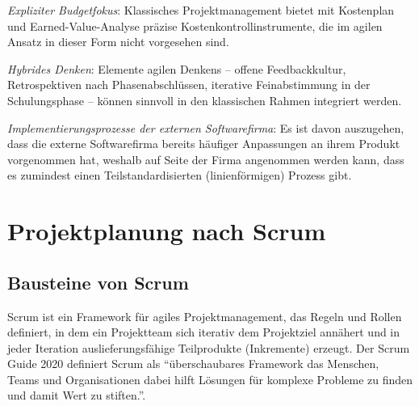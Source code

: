 \documentclass[
    a4paper,
    11pt,
    bibliography=totoc,
    listof=totoc,
    parskip=half,
    headings=normal
]{scrbook}
\begin{document}
\textit{Expliziter Budgetfokus}: Klassisches Projektmanagement bietet mit
Kostenplan und Earned-Value-Analyse präzise Kostenkontrollinstrumente, die im
agilen Ansatz in dieser Form nicht vorgesehen sind.

\textit{Hybrides Denken}: Elemente agilen Denkens -- offene Feedbackkultur,
Retrospektiven nach Phasenabschlüssen, iterative Feinabstimmung in der
Schulungsphase -- können sinnvoll in den klassischen Rahmen integriert werden\autocite[vgl.][Kap.~6]{Reppin2020}.

\textit{Implementierungsprozesse der externen Softwarefirma}: Es ist davon auszugehen, dass die externe Softwarefirma bereits häufiger Anpassungen an ihrem Produkt vorgenommen hat, weshalb auf Seite der Firma angenommen werden kann, dass es zumindest einen Teilstandardisierten (linienförmigen) Prozess gibt.

\section{Projektplanung nach Scrum}

\subsection{Bausteine von Scrum}

Scrum ist ein Framework für agiles Projektmanagement, das Regeln und Rollen definiert, in dem ein Projektteam
sich iterativ dem Projektziel annähert und in jeder Iteration auslieferungsfähige
Teilprodukte (Inkremente) erzeugt\autocite[vgl.][Kap.~3]{Reppin2020}. Der Scrum Guide 2020 definiert
Scrum als \enquote{überschaubares Framework das Menschen, Teams und Organisationen dabei hilft Lösungen für komplexe Probleme zu finden und damit Wert zu stiften.}\autocite[vgl.][]{SutherlandSchwaber2020}.
\end{document}
